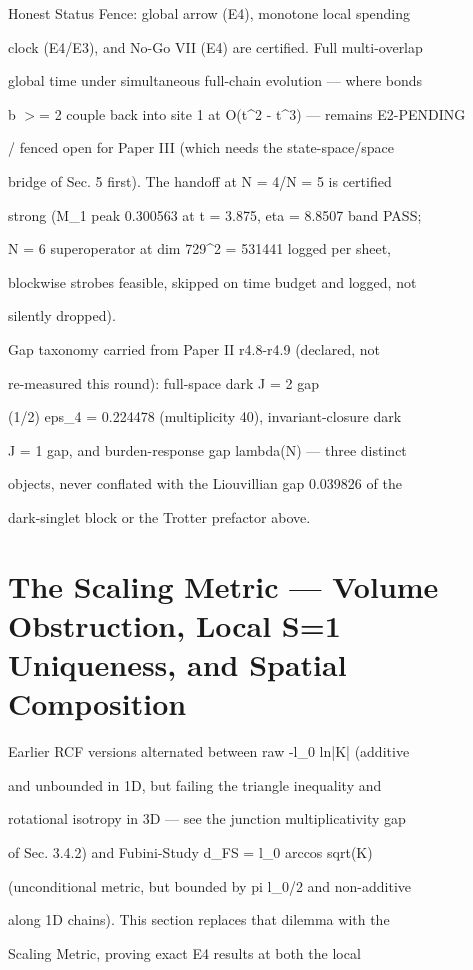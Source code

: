 \documentclass[11pt,a4paper]{article}
\theoremstyle{definition}
\begin{document}
Honest Status Fence: global arrow (E4), monotone local spending

clock (E4/E3), and No-Go VII (E4) are certified. Full multi-overlap

global time under simultaneous full-chain evolution — where bonds

b $>$= 2 couple back into site 1 at O(t\^{}2 - t\^{}3) — remains E2-PENDING

/ fenced open for Paper III (which needs the state-space/space

bridge of Sec. 5 first). The handoff at N = 4/N = 5 is certified

strong (M\_1 peak 0.300563 at t = 3.875, eta = 8.8507 band PASS;

N = 6 superoperator at dim 729\^{}2 = 531441 logged per sheet,

blockwise strobes feasible, skipped on time budget and logged, not

silently dropped).


Gap taxonomy carried from Paper II r4.8-r4.9 (declared, not

re-measured this round): full-space dark J = 2 gap

(1/2) eps\_4 = 0.224478 (multiplicity 40), invariant-closure dark

J = 1 gap, and burden-response gap lambda(N) — three distinct

objects, never conflated with the Liouvillian gap 0.039826 of the

dark-singlet block or the Trotter prefactor above.


\section{The Scaling Metric — Volume Obstruction, Local S=1 Uniqueness, and Spatial Composition}

Earlier RCF versions alternated between raw -l\_0 ln|K| (additive

and unbounded in 1D, but failing the triangle inequality and

rotational isotropy in 3D — see the junction multiplicativity gap

of Sec. 3.4.2) and Fubini-Study d\_FS = l\_0 arccos sqrt(K)

(unconditional metric, but bounded by pi l\_0/2 and non-additive

along 1D chains). This section replaces that dilemma with the

Scaling Metric, proving exact E4 results at both the local
\end{document}
